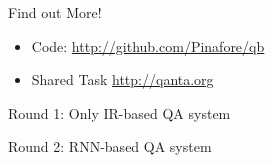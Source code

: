 \documentclass[xcolor=dvipsnames]{beamer}
\newcommand{\fsi}[2]{
\begin{frame}[plain]
\vspace*{-1pt}
\makebox[\linewidth]{\texttt{[image: \#1]}}
\begin{center}
#2
\end{center}
\end{frame}
}
\begin{document}
\begin{frame}{Find out More!}

		\begin{itemize}
			\item Code: \url{http://github.com/Pinafore/qb}
                        \item Shared Task \url{http://qanta.org}
		\end{itemize}

\end{frame}

\fsi{qb/trick/round_one}{Round 1: Only IR-based QA system}
\fsi{qb/trick/round_two}{Round 2: RNN-based QA system}




\end{document}
